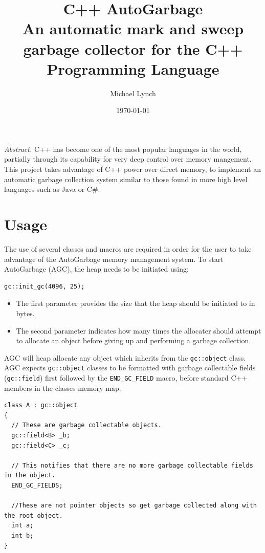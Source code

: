 \documentclass[11pt]{article}
\author{Michael Lynch}
\date{\today}
\title{C++ AutoGarbage\\\medskip
\large An automatic mark and sweep garbage collector for the C++ Programming Language}
\newenvironment{code}{\captionsetup{type=listing}}{}
\begin{document}
\begin{titlingpage}
\maketitle
\end{titlingpage}

\newpage
\vspace*{0.15\textheight}
\emph{Abstract.} C++ has become one of the most popular languages in the world, partially through its capability for very deep control
over memory mangement.
This project takes advantage of C++ power over direct memory, to implement an automatic garbage collection system
similar to those found in more high level languages such as Java or C\#.

\newpage
\tableofcontents
\newpage

\section{Usage}
\label{sec:orgad3520d}
The use of several classes and macros are required in order for the user to take advantage of the AutoGarbage memory management system.
To start AutoGarbage (AGC), the heap needs to be initiated using:

\begin{verbatim}
gc::init_gc(4096, 25);
\end{verbatim}

\begin{itemize}
\item The first parameter provides the size that the heap should be initiated to in bytes.
\item The second parameter indicates how many times the allocater should attempt to allocate an object before giving up and
performing a garbage collection.
\end{itemize}

AGC will heap allocate any object which inherits from the \texttt{gc::object} class.
AGC expects \texttt{gc::object} classes to be formatted with garbage collectable 
fields (\texttt{gc::field}) first followed by the \texttt{END\_GC\_FIELD} macro,
before standard C++ members in the classes memory map.

\begin{code}
\begin{verbatim}
class A : gc::object
{
  // These are garbage collectable objects.
  gc::field<B> _b;
  gc::field<C> _c;

  // This notifies that there are no more garbage collectable fields in the object.
  END_GC_FIELDS;

  //These are not pointer objects so get garbage collected along with the root object.
  int a;
  int b;
}
\end{verbatim}
\end{code}
\end{document}
